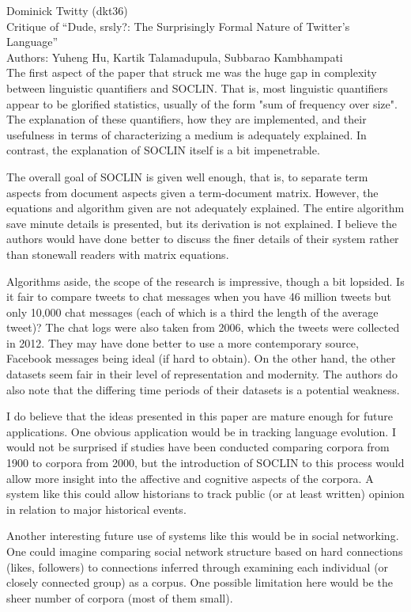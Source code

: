 \documentclass[12pt]{article}
\begin{document}
Dominick Twitty (dkt36)\\
Critique of ``Dude, srsly?: The Surprisingly Formal Nature of Twitter's Language''\\
Authors: Yuheng Hu, Kartik Talamadupula, Subbarao Kambhampati\\

The first aspect of the paper that struck me was the huge gap in complexity between linguistic quantifiers and SOCLIN. That is, most linguistic quantifiers appear to be glorified statistics, usually of the form "sum of frequency over size". The explanation of these quantifiers, how they are implemented, and their usefulness in terms of characterizing a medium is adequately explained. In contrast, the explanation of SOCLIN itself is a bit impenetrable. 

The overall goal of SOCLIN is given well enough, that is, to separate term aspects from document aspects given a term-document matrix. However, the equations and algorithm given are not adequately explained. The entire algorithm save minute details is presented, but its derivation is not explained. I believe the authors would have done better to discuss the finer details of their system rather than stonewall readers with matrix equations.

Algorithms aside, the scope of the research is impressive, though a bit lopsided. Is it fair to compare tweets to chat messages when you have 46 million tweets but only 10,000 chat messages (each of which is a third the length of the average tweet)? The chat logs were also taken from 2006, which the tweets were collected in 2012. They may have done better to use a more contemporary source, Facebook messages being ideal (if hard to obtain). On the other hand, the other datasets seem fair in their level of representation and modernity. The authors do also note that the differing time periods of their datasets is a potential weakness.

I do believe that the ideas presented in this paper are mature enough for future applications. One obvious application would be in tracking language evolution. I would not be surprised if studies have been conducted comparing corpora from 1900 to corpora from 2000, but the introduction of SOCLIN to this process would allow more insight into the affective and cognitive aspects of the corpora. A system like this could allow historians to track public (or at least written) opinion in relation to major historical events. 

Another interesting future use of systems like this would be in social networking. One could imagine comparing social network structure based on hard connections (likes, followers) to connections inferred through examining each individual (or closely connected group) as a corpus. One possible limitation here would be the sheer number of corpora (most of them small).
\end{document}
